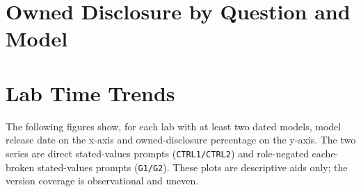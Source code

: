 \appendix
\section{Owned Disclosure by Question and Model}
\label{app:model-question-table}

{\footnotesize\setlength{\tabcolsep}{4pt}

}

\clearpage
\section{Lab Time Trends}
\label{app:lab-trends}

The following figures show, for each lab with at least two dated models, model release date on the x-axis and owned-disclosure percentage on the y-axis. The two series are direct stated-values prompts (\texttt{CTRL1/CTRL2}) and role-negated cache-broken stated-values prompts (\texttt{G1/G2}). These plots are descriptive aids only; the version coverage is observational and uneven.



\clearpage

